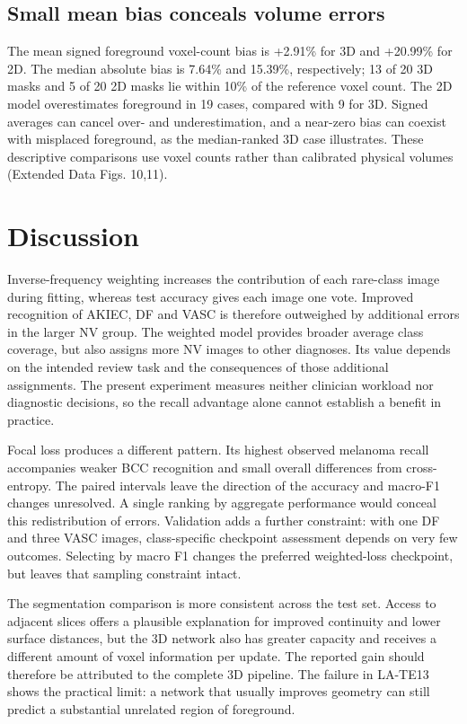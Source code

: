 \documentclass[11pt,a4paper]{article}
\begin{document}
\subsection*{Small mean bias conceals volume errors}

The mean signed foreground voxel-count bias is +2.91\% for 3D and +20.99\% for 2D. The median absolute bias is 7.64\% and 15.39\%, respectively; 13 of 20 3D masks and 5 of 20 2D masks lie within 10\% of the reference voxel count. The 2D model overestimates foreground in 19 cases, compared with 9 for 3D. Signed averages can cancel over- and underestimation, and a near-zero bias can coexist with misplaced foreground, as the median-ranked 3D case illustrates. These descriptive comparisons use voxel counts rather than calibrated physical volumes (Extended Data Figs. 10,11).



\section*{Discussion}

Inverse-frequency weighting increases the contribution of each rare-class image during fitting, whereas test accuracy gives each image one vote. Improved recognition of AKIEC, DF and VASC is therefore outweighed by additional errors in the larger NV group. The weighted model provides broader average class coverage, but also assigns more NV images to other diagnoses. Its value depends on the intended review task and the consequences of those additional assignments. The present experiment measures neither clinician workload nor diagnostic decisions, so the recall advantage alone cannot establish a benefit in practice.



Focal loss produces a different pattern. Its highest observed melanoma recall accompanies weaker BCC recognition and small overall differences from cross-entropy. The paired intervals leave the direction of the accuracy and macro-F1 changes unresolved. A single ranking by aggregate performance would conceal this redistribution of errors. Validation adds a further constraint: with one DF and three VASC images, class-specific checkpoint assessment depends on very few outcomes. Selecting by macro F1 changes the preferred weighted-loss checkpoint, but leaves that sampling constraint intact.



The segmentation comparison is more consistent across the test set. Access to adjacent slices offers a plausible explanation for improved continuity and lower surface distances, but the 3D network also has greater capacity and receives a different amount of voxel information per update. The reported gain should therefore be attributed to the complete 3D pipeline. The failure in LA-TE13 shows the practical limit: a network that usually improves geometry can still predict a substantial unrelated region of foreground.
\end{document}
